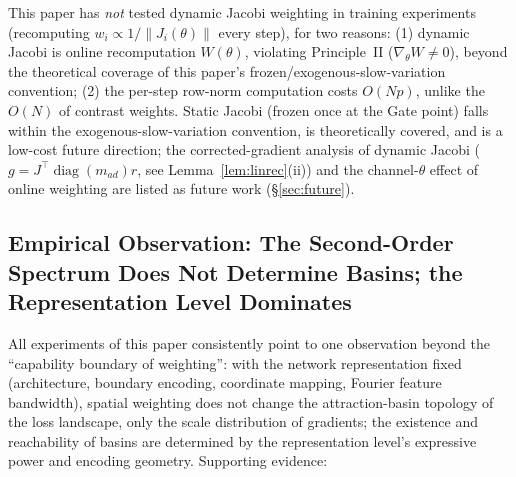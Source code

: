 \documentclass[11pt]{article}
\newcommand{\W}{W}
\DeclareMathOperator{\diag}{diag}
\numberwithin{equation}{section}
\begin{document}
This paper has \emph{not} tested dynamic Jacobi weighting in training experiments (recomputing $w_i\propto 1/\|J_i(\theta)\|$ every step), for two reasons: (1) dynamic Jacobi is online recomputation $\W(\theta)$, violating Principle~II ($\nabla_\theta\W\ne0$), beyond the theoretical coverage of this paper's frozen/exogenous-slow-variation convention; (2) the per-step row-norm computation costs $O(Np)$, unlike the $O(N)$ of contrast weights. Static Jacobi (frozen once at the Gate point) falls within the exogenous-slow-variation convention, is theoretically covered, and is a low-cost future direction; the corrected-gradient analysis of dynamic Jacobi ($g=J^\top\diag(m_{ad})r$, see Lemma~\ref{lem:linrec}(ii)) and the channel-$\theta$ effect of online weighting are listed as future work (\S\ref{sec:future}).

\subsection{Empirical Observation: The Second-Order Spectrum Does Not Determine Basins; the Representation Level Dominates}\label{sec:S-observation}

All experiments of this paper consistently point to one observation beyond the ``capability boundary of weighting'': with the network representation fixed (architecture, boundary encoding, coordinate mapping, Fourier feature bandwidth), spatial weighting does not change the attraction-basin topology of the loss landscape, only the scale distribution of gradients; the existence and reachability of basins are determined by the representation level's expressive power and encoding geometry. Supporting evidence:
\end{document}
